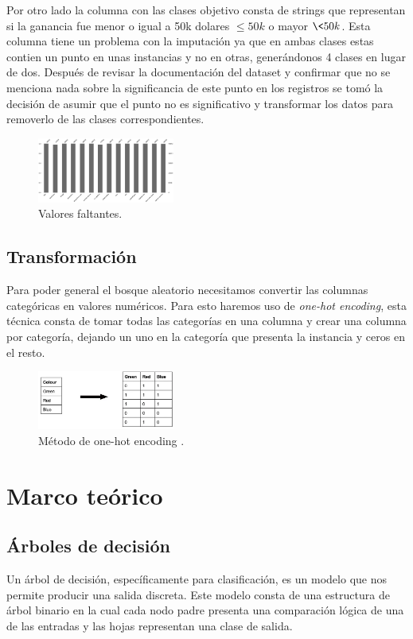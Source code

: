 \documentclass[twocolumn]{article}
\begin{document}
Por otro lado la columna con las clases objetivo consta de strings que representan
si la ganancia fue menor o igual a 50k dolares $\leq50k$ o mayor $\<50k$. Esta columna
tiene un problema con la imputación  ya que en ambas clases estas contien un punto 
en unas instancias y no en otras, generándonos 4 clases en lugar de dos. Después 
de revisar la documentación del dataset y confirmar que no se menciona nada sobre 
la significancia de este punto en los registros se tomó la decisión de asumir que 
el punto no es significativo y transformar los datos para removerlo de las clases
correspondientes.

\begin{figure}[!h]
\centering
\includegraphics[width=0.4\textwidth]{assets/missing.png}
\caption{\label{fig:missing}Valores faltantes.}
\end{figure}

\subsection{Transformación}
Para poder general el bosque aleatorio necesitamos convertir las columnas categóricas
en valores numéricos. Para esto haremos uso de \textit{one-hot encoding}, esta técnica
consta de tomar todas las categorías en una columna y crear una columna por categoría, 
dejando un uno en la categoría que presenta la instancia y ceros en el resto.

\begin{figure}[!h]
\centering
\includegraphics[width=0.4\textwidth]{assets/onehot.png}
\caption{\label{fig:onehot}Método de one-hot encoding \cite{onehot}.}
\end{figure}

\section{Marco teórico}
\subsection{Árboles de decisión}
Un árbol de decisión, específicamente para clasificación, es un modelo que nos 
permite producir una salida discreta. Este modelo consta de una estructura de árbol
binario en la cual cada nodo padre presenta una comparación lógica de una de las entradas
y las hojas representan una clase de salida.
\end{document}
